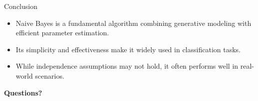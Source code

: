 \begin{frame}{Conclusion}
    \begin{itemize}
        \item Naive Bayes is a fundamental algorithm combining generative modeling with efficient parameter estimation.
        \item Its simplicity and effectiveness make it widely used in classification tasks.
        \item While independence assumptions may not hold, it often performs well in real-world scenarios.
    \end{itemize}
    \vspace{1cm}
    \centering
    \textbf{Questions?}
\end{frame}
